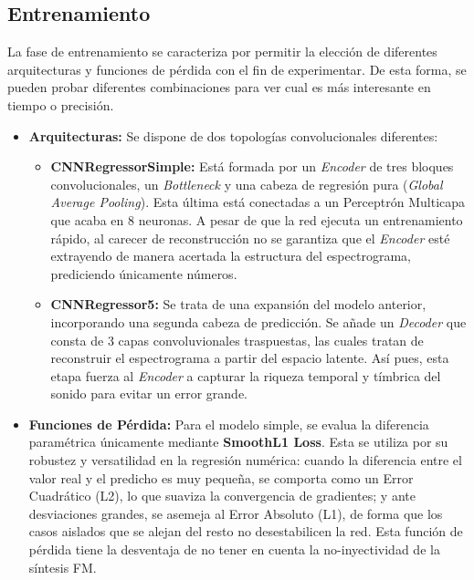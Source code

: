 \subsection{Entrenamiento}
\label{sec:entrenamiento_final}
La fase de entrenamiento se caracteriza por permitir la elección de diferentes arquitecturas y funciones de pérdida con el fin de experimentar. De esta 
forma, se pueden probar diferentes combinaciones para ver cual es más interesante en tiempo o precisión.
\begin{itemize}
 \item \textbf{Arquitecturas: }Se dispone de dos topologías convolucionales diferentes:
    \begin{itemize}
        \item \textbf{CNNRegressorSimple: }Está formada por un \textit{Encoder} de tres bloques convolucionales,
        un \textit{Bottleneck} y una cabeza de regresión pura (\textit{Global Average Pooling}). Esta última está conectadas
        a un Perceptrón Multicapa que acaba en 8 neuronas. A pesar de que la red ejecuta un entrenamiento rápido, al carecer de reconstrucción 
        no se garantiza que el \textit{Encoder} esté extrayendo de manera acertada la estructura del espectrograma, prediciendo únicamente números.
          
        \item \textbf{CNNRegressor5: }Se trata de una expansión del modelo anterior, incorporando una segunda cabeza de predicción. 
        Se añade un \textit{Decoder} que consta de 3 capas convoluvionales traspuestas, las cuales tratan de reconstruir el espectrograma 
        a partir del espacio latente. Así pues, esta etapa fuerza al \textit{Encoder} a capturar la riqueza temporal y tímbrica del sonido para evitar
        un error grande.
    \end{itemize}
 \item \textbf{Funciones de Pérdida: } Para el modelo simple, se evalua la diferencia paramétrica únicamente mediante
        \textbf{SmoothL1 Loss}. Esta se utiliza por su robustez y versatilidad en la regresión numérica: cuando la diferencia 
        entre el valor real y el predicho es muy pequeña, se comporta como un Error Cuadrático (L2), lo que suaviza la convergencia
        de gradientes; y ante desviaciones grandes, se asemeja al Error Absoluto (L1), de forma que los casos aislados que se alejan del resto 
        no desestabilicen la red. Esta función de pérdida tiene la desventaja de no tener en cuenta la no-inyectividad de la síntesis FM.


\end{itemize}
